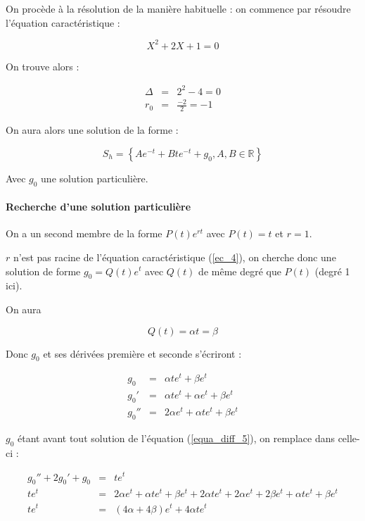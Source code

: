 \documentclass[a4paper, 11pt]{report} %
\newcommand{\R}{\mathbb{R}}
\begin{document}
On procède à la résolution de la manière habituelle : on commence par résoudre l'équation caractéristique :

\begin{equation}
X^2 + 2X + 1 = 0
\label{ec_4}
\end{equation}

On trouve alors :

\begin{eqnarray*}
\Delta & = & 2^2-4 = 0\\
r_0 & = & \frac{-2}{2} = -1
\end{eqnarray*}

On aura alors une solution de la forme :

\[
S_h = \left\{Ae^{-t}+Bte^{-t} + g_0, A,B\in\R\right\}
\]

Avec $g_0$ une solution particulière.

\paragraph{Recherche d'une solution particulière}

On a un second membre de la forme $P(t)e^{rt}$ avec $P(t) = t$ et $r = 1$.

$r$ n'est pas racine de l'équation caractéristique (\ref{ec_4}), on cherche donc une solution de forme $g_0 = Q(t)e^t$
avec $Q(t)$ de même degré que $P(t)$ (degré 1 ici).

On aura

\[ Q(t) = \alpha t = \beta \]

Donc $g_0$ et ses dérivées première et seconde s'écriront :

\begin{eqnarray*}
    g_0 & = & \alpha t e^t + \beta e^t\\
    g_0' & = & \alpha t e^t + \alpha e^t + \beta e^t\\
    g_0'' & = & 2\alpha e^t + \alpha t e^t + \beta e^t
\end{eqnarray*}

$g_0$ étant avant tout solution de l'équation (\ref{equa_diff_5}), on remplace dans celle-ci :

\begin{eqnarray*}
g_0'' + 2g_0' + g_0 & = & te^t\\
te^t & = & 2\alpha e^t + \alpha t e^t + \beta e^t + 2\alpha t e^t + 2\alpha e^t + 2\beta e^t +\alpha t e^t + \beta e^t\\
te^t & = &(4\alpha + 4\beta) e^t + 4\alpha t e^t
\end{eqnarray*}
\end{document}
